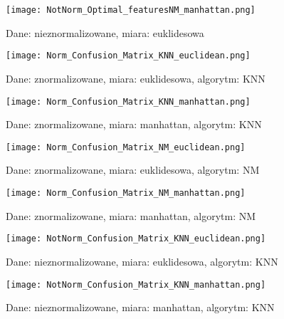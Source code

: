 	\begin{figure}[h!]
		\centering
		\texttt{[image: NotNorm\_Optimal\_featuresNM\_manhattan.png]}
		\captionsetup{justification=centering}
		\caption{Dane: nieznormalizowane, miara: euklidesowa}
		\label{fig:13}
	\end{figure}
	
	\begin{figure}[h!]
	 	\centering
	 	\texttt{[image: Norm\_Confusion\_Matrix\_KNN\_euclidean.png]}
	 	\captionsetup{justification=centering}
	 	\caption{Dane: znormalizowane, miara: euklidesowa, algorytm: KNN}
	 	\label{fig:14}
	 \end{figure}
 
 	\begin{figure}[h!]
 		\centering
 		\texttt{[image: Norm\_Confusion\_Matrix\_KNN\_manhattan.png]}
 		\captionsetup{justification=centering}
 		\caption{Dane: znormalizowane, miara: manhattan, algorytm: KNN}
 		\label{fig:15}
 	\end{figure}
 
 	\begin{figure}[h!]
 		\centering
 		\texttt{[image: Norm\_Confusion\_Matrix\_NM\_euclidean.png]}
 		\captionsetup{justification=centering}
 		\caption{Dane: znormalizowane, miara: euklidesowa, algorytm: NM}
 		\label{fig:16}
 	\end{figure}

	\begin{figure}[h!]
		\centering
		\texttt{[image: Norm\_Confusion\_Matrix\_NM\_manhattan.png]}
		\captionsetup{justification=centering}
		\caption{Dane: znormalizowane, miara: manhattan, algorytm: NM}
		\label{fig:17}
	\end{figure}

	\begin{figure}[h!]
		\centering
		\texttt{[image: NotNorm\_Confusion\_Matrix\_KNN\_euclidean.png]}
		\captionsetup{justification=centering}
		\caption{Dane: nieznormalizowane, miara: euklidesowa, algorytm: KNN}
		\label{fig:18}
	\end{figure}
	
	\begin{figure}[h!]
		\centering
		\texttt{[image: NotNorm\_Confusion\_Matrix\_KNN\_manhattan.png]}
		\captionsetup{justification=centering}
		\caption{Dane: nieznormalizowane, miara: manhattan, algorytm: KNN}
		\label{fig:19}
	\end{figure}
	
